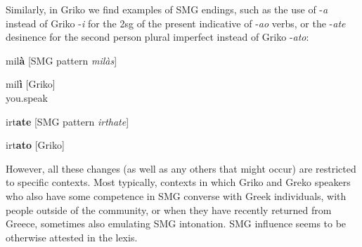 \documentclass[output=paper,hidelinks]{langscibook}
\begin{document}
Similarly, in Griko we find examples of SMG endings, such as the use of -\textit{a} instead of Griko -\textit{i} for the 2sg of the present indicative of -\textit{ao} verbs, or the -\textit{ate} desinence for the second person plural imperfect instead of Griko -\textit{ato}:

\ea 
\label{ex:key:5}
 mil\textbf{à} [SMG pattern \textit{milàs}] 
\z 

\ea 
\label{ex:key:6}

\gll mil\textbf{ì} [Griko] \\
you.speak \\
\z 


\ea 
\label{ex:key:7}
 irt\textbf{ate} [SMG pattern \textit{irthate}]
\z 


\ea 
\label{ex:key:8}
irt\textbf{ato}	[Griko]
\z 

\largerpage
However, all these changes (as well as any others that might occur) are restricted to specific contexts. Most typically, contexts in which Griko and Greko speakers who also have some competence in SMG converse with Greek individuals, with people outside of the community, or when they have recently returned from Greece, sometimes also emulating SMG intonation. SMG influence seems to be otherwise attested in the lexis. 
\end{document}
